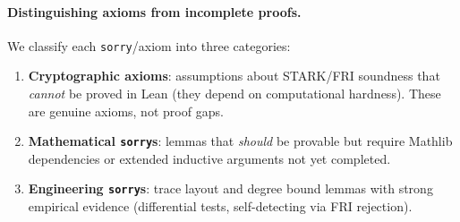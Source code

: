 \documentclass[11pt]{article}
\newcommand{\sorry}{\texttt{sorry}}
\begin{document}
\paragraph{Distinguishing axioms from incomplete proofs.}
We classify each \sorry{}/axiom into three categories:
\begin{enumerate}[nosep,leftmargin=*]
\item \textbf{Cryptographic axioms}: assumptions about STARK/FRI
  soundness that \emph{cannot} be proved in Lean (they depend on
  computational hardness).
  These are genuine axioms, not proof gaps.
\item \textbf{Mathematical \sorry{}s}: lemmas that \emph{should} be
  provable but require Mathlib dependencies or extended inductive
  arguments not yet completed.
\item \textbf{Engineering \sorry{}s}: trace layout and degree bound
  lemmas with strong empirical evidence (differential tests,
  self-detecting via FRI rejection).
\end{enumerate}
\end{document}
